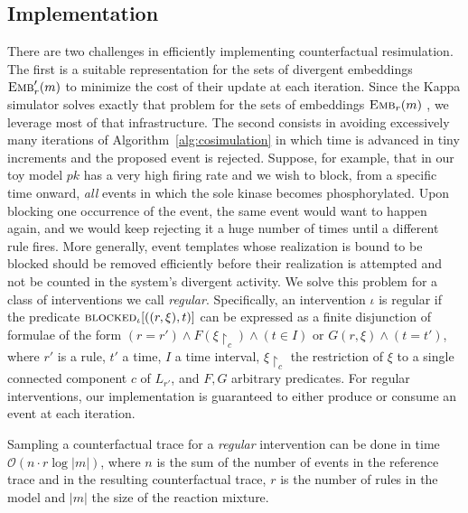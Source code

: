 
\subsection{Implementation}\label{subsec:implementation}

There are two challenges in efficiently implementing counterfactual
resimulation. The first is a suitable representation for the sets of
divergent embeddings ${\textsc{Emb}}'_{r}(m)$ to minimize the cost of their
update at each iteration. Since the Kappa simulator solves exactly
that problem for the sets of embeddings ${\textsc{Emb}}_{r}(m)$
\cite{DanosEtAl-APLAS07}, we leverage most of that infrastructure. The
second consists in avoiding excessively many iterations of
Algorithm~\ref{alg:cosimulation} in which time is advanced in tiny
increments and the proposed event is rejected.
Suppose, for example, that in our toy model
$pk$ has a very high firing rate and we wish to block, from a
specific time onward, \emph{all} events in which the sole kinase
becomes phosphorylated. Upon blocking one occurrence of the event, the
same event would want to happen again, and we would keep rejecting it
a huge number of times until a different rule fires. More generally,
event templates whose realization is bound to be blocked should be
removed efficiently before their realization is attempted and not be
counted in the system's divergent activity. We solve this problem
for a class of interventions we call \emph{regular}.
Specifically, an intervention $\iota$ is regular if
the predicate ${\textsc{blocked}}_{\iota}[((r, \xi), t)]$ can be expressed as a
finite disjunction of formulae of the form
$(r \!=\! r') \wedge F(\xi{\restriction_{c}}) \wedge (t \!\in\! I)$ or
$G(r, \xi) \wedge (t \!=\! t')$, where $r'$ is a rule, $t'$ a time, $I$ a
time interval, $\xi{\restriction_{c}}$ the restriction of $\xi$ to a
single connected component $c$ of $L_{r'}$, and $F, G$ arbitrary
predicates. For regular interventions, our implementation is
guaranteed to either produce or consume an event at each iteration.



\begin{proposition}
  Sampling a counterfactual trace for a \emph{regular} intervention
  can be done in time $\mathcal{O}(n \cdot r \log|m|)$, where $n$ is
  the sum of the number of events in the reference trace and in the
  resulting counterfactual trace, $r$ is the number of rules in the
  model and $|m|$ the size of the reaction mixture.
\end{proposition}

